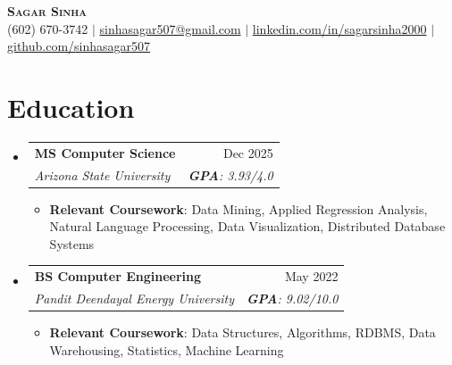 \documentclass[letterpaper,9pt]{article}
\makeatletter
\newcommand{\resumeItem}[1]{
  \item\small{
    {#1 \vspace{-2pt}}
  }
}
\newcommand{\resumeSubheading}[4]{
  \vspace{-2pt}\item
    \begin{tabular*}{0.97\textwidth}[t]{l@{\extracolsep{\fill}}r}
      \textbf{#1} & {\small #2} \\
      \textit{\small#3} & \textit{\small #4} \\
    \end{tabular*}\vspace{-7pt}
}
\newcommand{\resumeSubHeadingListStart}{\begin{itemize}[leftmargin=0.15in, label={}]}
\newcommand{\resumeSubHeadingListEnd}{\end{itemize}}
\newcommand{\resumeItemListStart}{\begin{itemize}}
\newcommand{\resumeItemListEnd}{\end{itemize}\vspace{-5pt}}
\makeatother
\begin{document}
\vspace*{-10pt} 
\begin{center}
    \textbf{\Huge \scshape Sagar Sinha} \\ \vspace{4pt}
    \small (602) 670-3742 $|$
    \href{mailto:sinhasagar507@gmail.com}{sinhasagar507@gmail.com} $|$
    \href{https://linkedin.com/in/sagarsinha2000}{linkedin.com/in/sagarsinha2000} $|$
    \href{https://github.com/sinhasagar507}{github.com/sinhasagar507}
\end{center}


\section{Education}
\resumeSubHeadingListStart
    \resumeSubheading
      {MS Computer Science}{Dec 2025}
      {Arizona State University}{\textbf{GPA}: 3.93/4.0}
      \resumeItemListStart
        \resumeItem{\textbf{Relevant Coursework}: Data Mining, Applied Regression Analysis, Natural Language Processing, Data Visualization, Distributed Database Systems}
      \resumeItemListEnd
    \resumeSubheading
      {BS Computer Engineering}{May 2022}
      {Pandit Deendayal Energy University}{\textbf{GPA}: 9.02/10.0}
      \resumeItemListStart
        \resumeItem{\textbf{Relevant Coursework}: Data Structures, Algorithms, RDBMS, Data Warehousing, Statistics, Machine Learning}
      \resumeItemListEnd
\resumeSubHeadingListEnd

\end{document}
